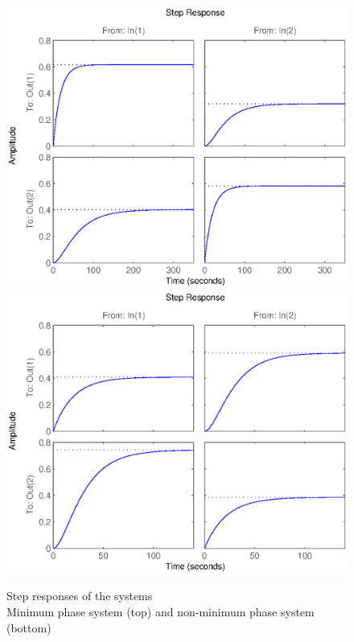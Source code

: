 \begin{figure}[h!t]
    \includegraphics[width=\columnwidth]{fig/step315m}
    \includegraphics[width=\columnwidth]{fig/step315nm}
    \caption{Step responses of the systems \\ Minimum phase system (top) and non-minimum phase system (bottom)}    
    \label{step315}
\end{figure}
